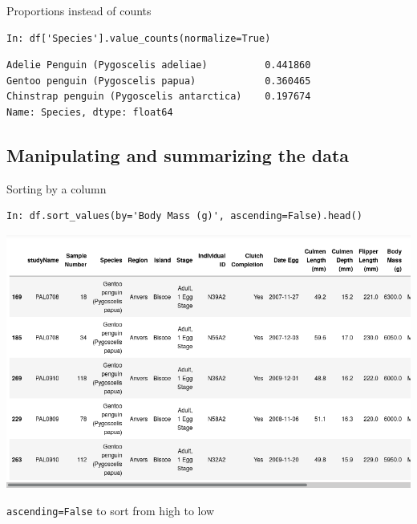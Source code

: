 \documentclass[aspectratio=169,usenames,dvipsnames]{beamer}
\begin{document}
\begin{frame}[fragile]{Proportions instead of counts}
\begin{lstlisting}
In: df['Species'].value_counts(normalize=True)
\end{lstlisting}\vspace{-1em}\begin{lstlisting}[style=plain]
Adelie Penguin (Pygoscelis adeliae)          0.441860
Gentoo penguin (Pygoscelis papua)            0.360465
Chinstrap penguin (Pygoscelis antarctica)    0.197674
Name: Species, dtype: float64
\end{lstlisting}
\end{frame}


\subsection{Manipulating and summarizing the data}
\frame{\tableofcontents[currentsubsection]}
\begin{frame}[fragile]{Sorting by a column}
\begin{lstlisting}
In: df.sort_values(by='Body Mass (g)', ascending=False).head()
\end{lstlisting}

\vspace{-1em}
\includegraphics[height=0.7\textheight]{fig/penguinsort}

\lstinline|ascending=False| to sort from high to low
\end{frame}
\end{document}
